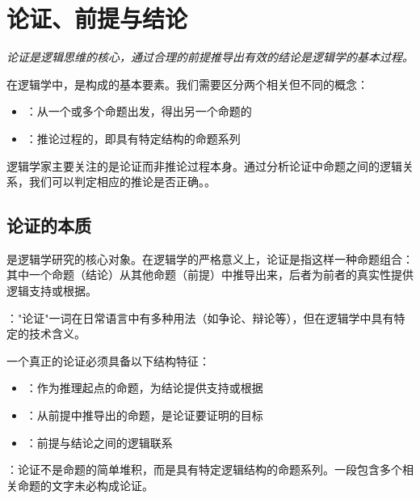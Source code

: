 \section{论证、前提与结论}

\begin{logicbox}[title=引言]
\textit{论证是逻辑思维的核心，通过合理的前提推导出有效的结论是逻辑学的基本过程。}
\end{logicbox}

在逻辑学中，是构成的基本要素。我们需要区分两个相关但不同的概念：

\begin{theorembox}[title=推论与论证的区别]
\begin{itemize}
  \item {}：从一个或多个命题出发，得出另一个命题的
  \item {}：推论过程的，即具有特定结构的命题系列
\end{itemize}
\end{theorembox}

逻辑学家主要关注的是论证而非推论过程本身。通过分析论证中命题之间的逻辑关系，我们可以判定相应的推论是否正确。。

\subsection{论证的本质}

是逻辑学研究的核心对象。在逻辑学的严格意义上，论证是指这样一种命题组合：其中一个命题（结论）从其他命题（前提）中推导出来，后者为前者的真实性提供逻辑支持或根据。

："论证"一词在日常语言中有多种用法（如争论、辩论等），但在逻辑学中具有特定的技术含义。

\begin{theorembox}[title=论证的逻辑结构]
一个真正的论证必须具备以下结构特征：
\begin{itemize}
  \item {}：作为推理起点的命题，为结论提供支持或根据
  \item {}：从前提中推导出的命题，是论证要证明的目标
  \item {}：前提与结论之间的逻辑联系
\end{itemize}

：论证不是命题的简单堆积，而是具有特定逻辑结构的命题系列。一段包含多个相关命题的文字未必构成论证。
\end{theorembox}

